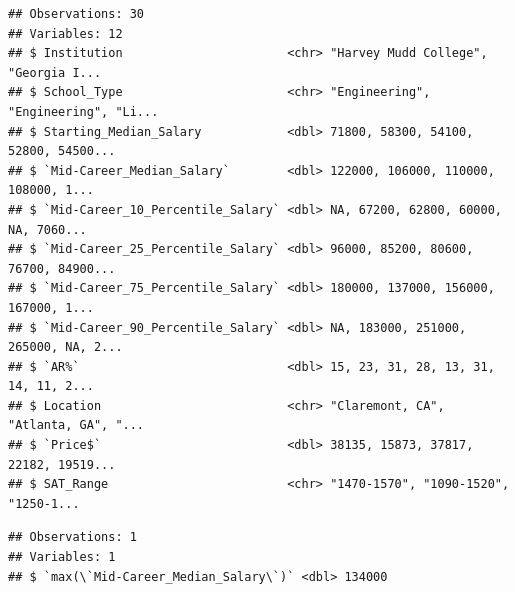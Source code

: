\documentclass[]{article}
\newenvironment{Shaded}{\begin{snugshade}}{\end{snugshade}}
\newcommand{\KeywordTok}[1]{\textcolor[rgb]{0.13,0.29,0.53}{\textbf{#1}}}
\newcommand{\DataTypeTok}[1]{\textcolor[rgb]{0.13,0.29,0.53}{#1}}
\newcommand{\FloatTok}[1]{\textcolor[rgb]{0.00,0.00,0.81}{#1}}
\newcommand{\StringTok}[1]{\textcolor[rgb]{0.31,0.60,0.02}{#1}}
\newcommand{\OperatorTok}[1]{\textcolor[rgb]{0.81,0.36,0.00}{\textbf{#1}}}
\newcommand{\NormalTok}[1]{#1}
\begin{document}
\begin{Shaded}
\end{Shaded}

\begin{verbatim}
## Observations: 30
## Variables: 12
## $ Institution                       <chr> "Harvey Mudd College", "Georgia I...
## $ School_Type                       <chr> "Engineering", "Engineering", "Li...
## $ Starting_Median_Salary            <dbl> 71800, 58300, 54100, 52800, 54500...
## $ `Mid-Career_Median_Salary`        <dbl> 122000, 106000, 110000, 108000, 1...
## $ `Mid-Career_10_Percentile_Salary` <dbl> NA, 67200, 62800, 60000, NA, 7060...
## $ `Mid-Career_25_Percentile_Salary` <dbl> 96000, 85200, 80600, 76700, 84900...
## $ `Mid-Career_75_Percentile_Salary` <dbl> 180000, 137000, 156000, 167000, 1...
## $ `Mid-Career_90_Percentile_Salary` <dbl> NA, 183000, 251000, 265000, NA, 2...
## $ `AR%`                             <dbl> 15, 23, 31, 28, 13, 31, 14, 11, 2...
## $ Location                          <chr> "Claremont, CA", "Atlanta, GA", "...
## $ `Price$`                          <dbl> 38135, 15873, 37817, 22182, 19519...
## $ SAT_Range                         <chr> "1470-1570", "1090-1520", "1250-1...
\end{verbatim}

\begin{Shaded}
\end{Shaded}

\begin{verbatim}
## Observations: 1
## Variables: 1
## $ `max(\`Mid-Career_Median_Salary\`)` <dbl> 134000
\end{verbatim}

\begin{Shaded}
\end{Shaded}
\end{document}
